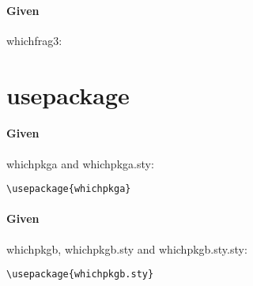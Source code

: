 \documentclass{article}
\begin{document}
\paragraph{Given} whichfrag3:

\verb|| \textrightarrow 

\section{usepackage}
\paragraph{Given} whichpkga and whichpkga.sty:

\verb|\usepackage{whichpkga}| \textrightarrow \whichpkga

\paragraph{Given} whichpkgb, whichpkgb.sty and whichpkgb.sty.sty:

\verb|\usepackage{whichpkgb.sty}| \textrightarrow \whichpkgb


\end{document}
